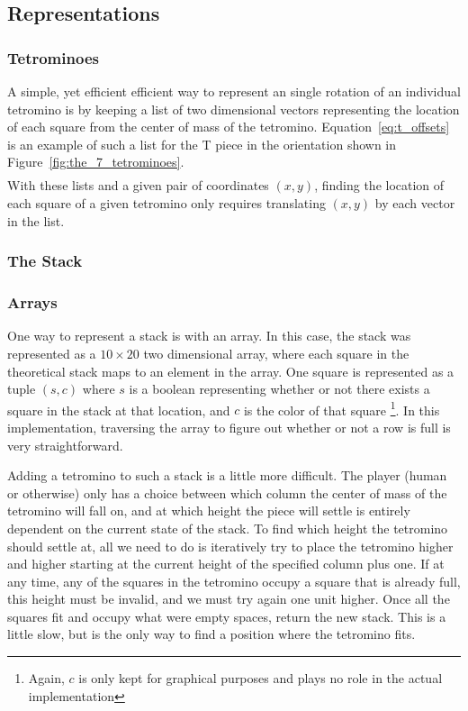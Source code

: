 \documentclass[fontsize=12pt]{article}
\begin{document}
\subsection{Representations}
\label{sub:representations}
\subsubsection{Tetrominoes}
\label{ssub:tetrominoes}

\par A simple, yet efficient efficient way to represent an single rotation of an individual tetromino is by keeping a list of two dimensional vectors representing the location of each square from the center of mass of the tetromino. Equation~\ref{eq:t_offsets} is an example of such a list for the T piece in the orientation shown in Figure~\ref{fig:the_7_tetrominoes}.
\begin{align}
  [(0,0), (-1, 0), (0, 1), (1, 0)]\label{eq:t_offsets}
\end{align}
With these lists and a given pair of coordinates $(x,y)$, finding the location of each square of a given tetromino only requires translating $(x,y)$ by each vector in the list.

\subsubsection{The Stack}
\label{ssub:the_stack}
\subsubsection{Arrays}
\label{ssub:arrays}
\par One way to represent a stack is with an array. In this case, the stack was represented as a $10\times 20$ two dimensional array, where each square in the theoretical stack maps to an element in the array. One square is represented as a tuple $(s,c)$ where $s$ is a boolean representing whether or not there exists a square in the stack at that location, and $c$ is the color of that square \footnote{Again, $c$ is only kept for graphical purposes and plays no role in the actual implementation}. In this implementation, traversing the array to figure out whether or not a row is full is very straightforward.
\par Adding a tetromino to such a stack is a little more difficult. The player (human or otherwise) only has a choice between which column the center of mass of the tetromino will fall on, and at which height the piece will settle is entirely dependent on the current state of the stack. To find which height the tetromino should settle at, all we need to do is iteratively try to place the tetromino higher and higher starting at the current height of the specified column plus one. If at any time, any of the squares in the tetromino occupy a square that is already full, this height must be invalid, and we must try again one unit higher. Once all the squares fit and occupy what were empty spaces, return the new stack. This is a little slow, but is the only way to find a position where the tetromino fits.
\end{document}
